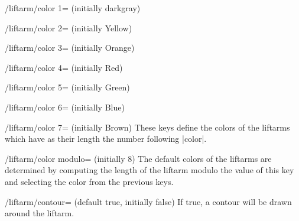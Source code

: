\documentclass[a4paper,english,dvipsnames]{ltxdoc}
\begin{document}
\begin{command}{\liftarm{}}
\begin{key}{/liftarm/color 1= (initially darkgray)}
\end{key}
\begin{key}{/liftarm/color 2= (initially Yellow)}
\end{key}
\begin{key}{/liftarm/color 3= (initially Orange)}
\end{key}
\begin{key}{/liftarm/color 4= (initially Red)}
\end{key}
\begin{key}{/liftarm/color 5= (initially Green)}
\end{key}
\begin{key}{/liftarm/color 6= (initially Blue)}
\end{key}
\begin{key}{/liftarm/color 7= (initially Brown)}
These keys define the colors of the liftarms which have as their length the number following |color|.
\end{key}
\begin{key}{/liftarm/color modulo= (initially 8)}
The default colors of the liftarms are determined by computing the length of the liftarm modulo the value of this key and selecting the color from the previous keys.
\begin{codeexample}[width=10cm]
\end{codeexample}
\begin{codeexample}[width=10cm]
\end{codeexample}
\end{key}
\begin{key}{/liftarm/contour= (default true, initially false)}
If true, a contour will be drawn around the liftarm.
\begin{codeexample}[width=10cm]

\end{codeexample}
\end{key}
\end{command}
\end{document}
